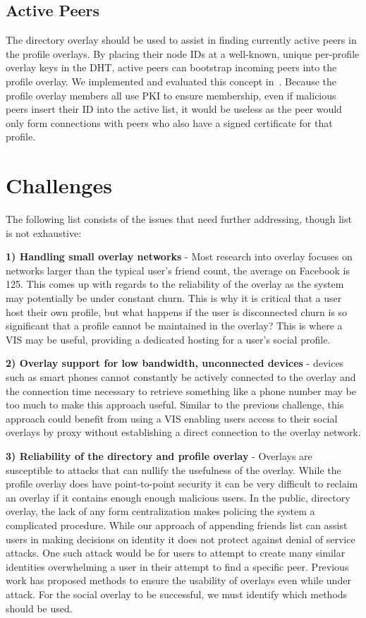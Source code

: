\documentclass[letterpaper,twocolumn,10pt]{article}
\begin{document}
\subsection{Active Peers}
The directory overlay should be used to assist in finding currently active peers
in the profile overlays.  By placing their node IDs at a well-known, unique
per-profile overlay keys in the DHT, active peers can bootstrap incoming peers
into the profile overlay.  We implemented and evaluated this concept
in~\cite{icdcs10}.  Because the profile overlay members all use PKI to ensure
membership, even if malicious peers insert their ID into the active list, it
would be useless as the peer would only form connections with peers who also
have a signed certificate for that profile.

\section{Challenges}
\label{outstanding}
The following list consists of the issues that need further addressing, though
list is not exhaustive:

{\bf 1) Handling small overlay networks} - Most research into overlay focuses on
networks larger than the typical user's friend count, the average on Facebook
is 125.  This comes up with regards to the reliability of the overlay as the
system may potentially be under constant churn.  This is why it is critical
that a user host their own profile, but what happens if the user is disconnected
churn is so significant that a profile cannot be maintained in the overlay?
This is where a VIS may be useful, providing a dedicated hosting for a user's
social profile.

{\bf 2) Overlay support for low bandwidth, unconnected devices} - devices such as
smart phones cannot constantly be actively connected to the overlay and the
connection time necessary to retrieve something like a phone number may be
too much to make this approach useful.  Similar to the previous challenge,
this approach could benefit from using a VIS enabling users access to their
social overlays by proxy without establishing a direct connection to the overlay
network.

{\bf 3) Reliability of the directory and profile overlay} - Overlays are
susceptible to attacks that can nullify the usefulness of the overlay.  While
the profile overlay does have point-to-point security it can be very difficult
to reclaim an overlay if it contains enough enough malicious users.  In the public,
directory overlay, the lack of any form centralization makes policing the system
a complicated procedure.  While our approach of appending friends list can assist
users in making decisions on identity it does not protect against denial of
service attacks.  One such attack would be for users to attempt to create many
similar identities overwhelming a user in their attempt to find a specific peer.
Previous work has proposed methods to ensure the usability of overlays even
while under attack.  For the social overlay to be successful, we must identify
which methods should be used.
\end{document}
